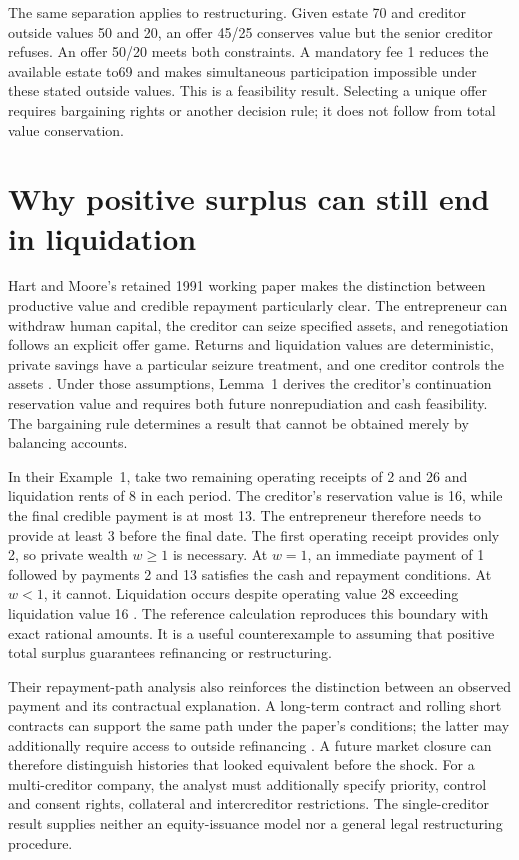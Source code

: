 The same separation applies to restructuring. Given estate 70 and creditor
outside values 50 and 20, an offer 45/25 conserves value but the senior creditor
refuses. An offer 50/20 meets both constraints. A mandatory fee 1 reduces the
available estate to69 and makes simultaneous participation impossible under
these stated outside values. This is a feasibility result. Selecting a unique
offer requires bargaining rights or another decision rule; it does not follow
from total value conservation.

\section{Why positive surplus can still end in liquidation}
Hart and Moore's retained 1991 working paper makes the distinction between
productive value and credible repayment particularly clear. The entrepreneur
can withdraw human capital, the creditor can seize specified assets, and
renegotiation follows an explicit offer game. Returns and liquidation values
are deterministic, private savings have a particular seizure treatment, and
one creditor controls the assets \cite[Sections~2--3 and Appendix~A1--A4]{litclosehartmoore}.
Under those assumptions, Lemma~1 derives the creditor's continuation reservation
value and requires both future nonrepudiation and cash feasibility. The bargaining
rule determines a result that cannot be obtained merely by balancing accounts.

In their Example~1, take two remaining operating receipts of 2 and 26 and
liquidation rents of 8 in each period. The creditor's reservation value is
16, while the final credible payment is at most 13. The entrepreneur therefore
needs to provide at least 3 before the final date. The first operating receipt
provides only 2, so private wealth $w\ge1$ is necessary. At $w=1$, an immediate
payment of 1 followed by payments 2 and 13 satisfies the cash and repayment
conditions. At $w<1$, it cannot. Liquidation occurs despite operating value
28 exceeding liquidation value 16 \cite[Example~1, printed p.~16]{litclosehartmoore}.
The reference calculation reproduces this boundary with exact rational amounts.
It is a useful counterexample to assuming that positive total surplus guarantees
refinancing or restructuring.

Their repayment-path analysis also reinforces the distinction between an
observed payment and its contractual explanation. A long-term contract and
rolling short contracts can support the same path under the paper's conditions;
the latter may additionally require access to outside refinancing
\cite[Proposition~2 and printed pp.~27--28]{litclosehartmoore}. A future market closure
can therefore distinguish histories that looked equivalent before the shock.
For a multi-creditor company, the analyst must additionally specify priority,
control and consent rights, collateral and intercreditor restrictions. The
single-creditor result supplies neither an equity-issuance model nor a general
legal restructuring procedure.
